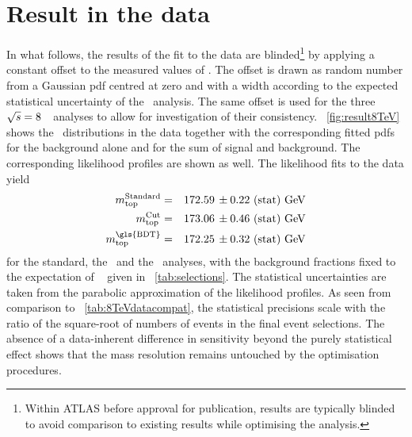 \section{Result in the data}
\label{sect:application8TeV}
%
In what follows, the results of the fit to the data are blinded\footnote{Within \gls{ATLAS} before approval for publication, results are typically blinded to avoid comparison to existing results while optimising the analysis.} by applying a constant offset to the measured values of \mt. %
%
The offset is drawn as random number from a Gaussian \gls{pdf} centred at zero and with a width according to the expected statistical uncertainty of the \cutbased\ analysis. The same offset is used for the three ${\sqrt{s}}=8$~\TeV\ analyses to allow for investigation of their consistency. %
%
\Fig~\ref{fig:result8TeV} shows the \mlbr\ distributions in the data together with the corresponding fitted \glspl{pdf} for the background alone and for the sum of signal and background. The corresponding likelihood profiles are shown as well.
%
%
%
The likelihood fits to the data yield
%
\begin{eqnarray*}
  \mt^\mathrm{Standard} & = &\XZst{\EightValueStandard}{\EightStatStandard}~\GeV \\
  \mt^\mathrm{Cut}       & = &\XZst{\EightValue}{\EightStat}~\GeV \\
  \mt^\mathrm{\gls{BDT}} & = &\XZst{\BDTValue}{\BDTStat}~\GeV
\end{eqnarray*}
%
for the standard, the \cutbased\ and the \mvabased\ analyses, with the background fractions fixed to the expectation of \bkgfrBDT\ 
given in \tab~\ref{tab:selections}. 
%
The statistical uncertainties are taken from the parabolic approximation of the likelihood profiles.
%
As seen from comparison to \tab~\ref{tab:8TeVdatacompat}, the statistical precisions scale with the ratio of the square-root of numbers of events in the final event selections. The absence of a data-inherent difference in sensitivity beyond the purely statistical effect shows that the mass resolution remains untouched by the optimisation procedures.
